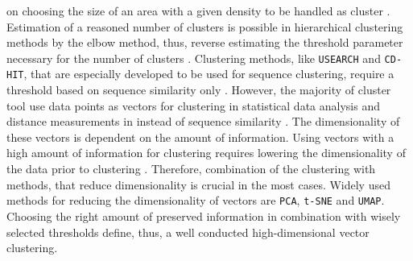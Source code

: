 on choosing the size of an area with a given density to be handled as cluster \autocite{madhulatha_overview_2012}. Estimation of a reasoned number of clusters is possible in hierarchical clustering methods by the elbow method, thus, reverse estimating the threshold parameter necessary for the number of clusters \autocite{satopaa_finding_2011, madhulatha_overview_2012}. Clustering methods, like \texttt{USEARCH} and \texttt{CD-HIT}, that are especially developed to be used for sequence clustering, require a threshold based on sequence similarity only \autocite{li_cd-hit_2006, edgar_usearch_2010}. However, the majority of cluster tool use data points as vectors for clustering in statistical data analysis and distance measurements in instead of sequence similarity \autocite{madhulatha_overview_2012}. The dimensionality of these vectors is dependent on the amount of information. Using vectors with a high amount of information for clustering requires lowering the dimensionality of the data prior to clustering \autocite{assent_clustering_2012}. Therefore, combination of the clustering with methods, that reduce dimensionality is crucial in the most cases. Widely used methods for reducing the dimensionality of vectors are \texttt{PCA}, \texttt{t-SNE} and \texttt{UMAP}. Choosing the right amount of preserved information in combination with wisely selected thresholds define, thus, a well conducted high-dimensional vector clustering. 

